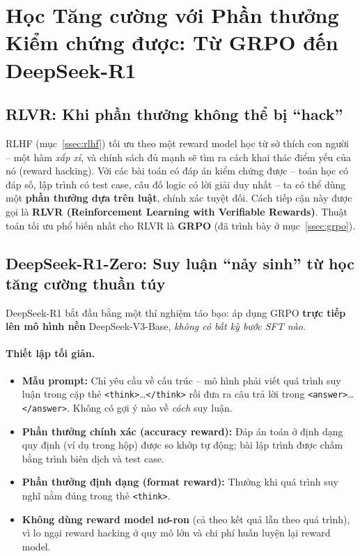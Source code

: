 
\section{Học Tăng cường với Phần thưởng Kiểm chứng được: Từ GRPO đến DeepSeek-R1 \newtag}
\label{sec:rl_reasoning}

\subsection{RLVR: Khi phần thưởng không thể bị “hack”}
\label{ssec:rlvr}
RLHF (mục~\ref{ssec:rlhf}) tối ưu theo một reward model học từ sở thích con người -- một hàm \emph{xấp xỉ}, và chính sách đủ mạnh sẽ tìm ra cách khai thác điểm yếu của nó (reward hacking). Với các bài toán có đáp án kiểm chứng được -- toán học có đáp số, lập trình có test case, câu đố logic có lời giải duy nhất -- ta có thể dùng một \textbf{phần thưởng dựa trên luật}, chính xác tuyệt đối. Cách tiếp cận này được gọi là \textbf{RLVR (Reinforcement Learning with Verifiable Rewards)}. Thuật toán tối ưu phổ biến nhất cho RLVR là \textbf{GRPO} (đã trình bày ở mục~\ref{ssec:grpo}).

\subsection{DeepSeek-R1-Zero: Suy luận “nảy sinh” từ học tăng cường thuần túy}
\label{ssec:r1_zero}
DeepSeek-R1 \cite{deepseekai2025r1} bắt đầu bằng một thí nghiệm táo bạo: áp dụng GRPO \textbf{trực tiếp lên mô hình nền} DeepSeek-V3-Base, \emph{không có bất kỳ bước SFT nào}.

\paragraph{Thiết lập tối giản.}
\begin{itemize}
	\item \textbf{Mẫu prompt:} Chỉ yêu cầu về cấu trúc -- mô hình phải viết quá trình suy luận trong cặp thẻ \texttt{<think>}\ldots\texttt{</think>} rồi đưa ra câu trả lời trong \texttt{<answer>}\ldots\texttt{</answer>}. Không có gợi ý nào về \emph{cách} suy luận.
	\item \textbf{Phần thưởng chính xác (accuracy reward):} Đáp án toán ở định dạng quy định (ví dụ trong hộp) được so khớp tự động; bài lập trình được chấm bằng trình biên dịch và test case.
	\item \textbf{Phần thưởng định dạng (format reward):} Thưởng khi quá trình suy nghĩ nằm đúng trong thẻ \texttt{<think>}.
	\item \textbf{Không dùng reward model nơ-ron} (cả theo kết quả lẫn theo quá trình), vì lo ngại reward hacking ở quy mô lớn và chi phí huấn luyện lại reward model.
\end{itemize}

